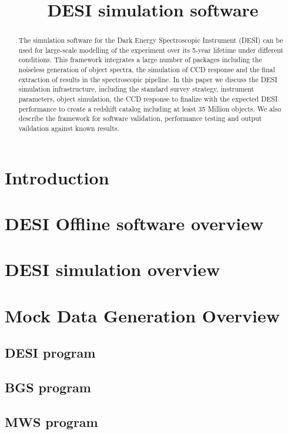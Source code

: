 \documentclass[12pt]{article}
\title {DESI simulation software}
\begin{document}
\maketitle
\begin{abstract}
The simulation software for the Dark Energy Spectroscopic Instrument
(DESI) can be used for large-scale modelling of the experiment over
its 5-year lifetime under different conditions.
This framework integrates a large number of packages including the
noiseless generation of object spectra, the simulation of CCD
response and the final extraction of results in the spectroscopic
pipeline. 
In this paper we discuss the DESI simulation infrastructure, including
the standard survey strategy, instrument parameters, object
simulation, the CCD response to finalize with the expected
DESI performance to create a redshift catalog including at least 35
Million objects. 
We also describe the framework for software validation,
performance testing and output vaildation against known results. 
\end{abstract}

\tableofcontents
\section{Introduction}

\section{DESI Offline software overview}

\section{DESI simulation overview}

\section{Mock Data Generation Overview}

\subsection{DESI program}

\subsection{BGS program}

\subsection{MWS program}
\end{document}
